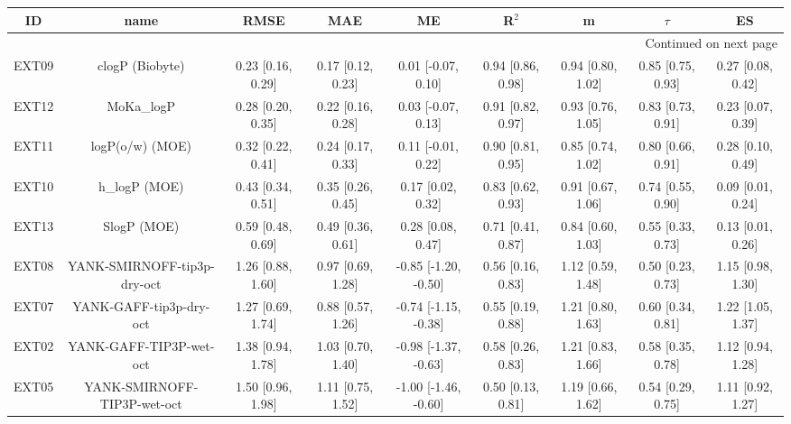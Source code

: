 \documentclass{article}
\begin{document}
\begin{center}
\scriptsize
\begin{longtable}{|ccccccccc|}
\toprule
    ID &                         name &               RMSE &                MAE &                    ME &              R$^2$ &                  m &             $\tau$ &                 ES \\
\midrule
\endhead
\midrule
\multicolumn{9}{r}{{Continued on next page}} \\
\midrule
\endfoot

\bottomrule
\endlastfoot
 EXT09 &              clogP (Biobyte) &  0.23 [0.16, 0.29] &  0.17 [0.12, 0.23] &    0.01 [-0.07, 0.10] &  0.94 [0.86, 0.98] &  0.94 [0.80, 1.02] &  0.85 [0.75, 0.93] &  0.27 [0.08, 0.42] \\
 EXT12 &                   MoKa\_logP &  0.28 [0.20, 0.35] &  0.22 [0.16, 0.28] &    0.03 [-0.07, 0.13] &  0.91 [0.82, 0.97] &  0.93 [0.76, 1.05] &  0.83 [0.73, 0.91] &  0.23 [0.07, 0.39] \\
 EXT11 &              logP(o/w) (MOE) &  0.32 [0.22, 0.41] &  0.24 [0.17, 0.33] &    0.11 [-0.01, 0.22] &  0.90 [0.81, 0.95] &  0.85 [0.74, 1.02] &  0.80 [0.66, 0.91] &  0.28 [0.10, 0.49] \\
 EXT10 &                h\_logP (MOE) &  0.43 [0.34, 0.51] &  0.35 [0.26, 0.45] &     0.17 [0.02, 0.32] &  0.83 [0.62, 0.93] &  0.91 [0.67, 1.06] &  0.74 [0.55, 0.90] &  0.09 [0.01, 0.24] \\
 EXT13 &                  SlogP (MOE) &  0.59 [0.48, 0.69] &  0.49 [0.36, 0.61] &     0.28 [0.08, 0.47] &  0.71 [0.41, 0.87] &  0.84 [0.60, 1.03] &  0.55 [0.33, 0.73] &  0.13 [0.01, 0.26] \\
 EXT08 &  YANK-SMIRNOFF-tip3p-dry-oct &  1.26 [0.88, 1.60] &  0.97 [0.69, 1.28] &  -0.85 [-1.20, -0.50] &  0.56 [0.16, 0.83] &  1.12 [0.59, 1.48] &  0.50 [0.23, 0.73] &  1.15 [0.98, 1.30] \\
 EXT07 &      YANK-GAFF-tip3p-dry-oct &  1.27 [0.69, 1.74] &  0.88 [0.57, 1.26] &  -0.74 [-1.15, -0.38] &  0.55 [0.19, 0.88] &  1.21 [0.80, 1.63] &  0.60 [0.34, 0.81] &  1.22 [1.05, 1.37] \\
 EXT02 &      YANK-GAFF-TIP3P-wet-oct &  1.38 [0.94, 1.78] &  1.03 [0.70, 1.40] &  -0.98 [-1.37, -0.63] &  0.58 [0.26, 0.83] &  1.21 [0.83, 1.66] &  0.58 [0.35, 0.78] &  1.12 [0.94, 1.28] \\
 EXT05 &  YANK-SMIRNOFF-TIP3P-wet-oct &  1.50 [0.96, 1.98] &  1.11 [0.75, 1.52] &  -1.00 [-1.46, -0.60] &  0.50 [0.13, 0.81] &  1.19 [0.66, 1.62] &  0.54 [0.29, 0.75] &  1.11 [0.92, 1.27] \\
\end{longtable}
\end{center}
\end{document}
